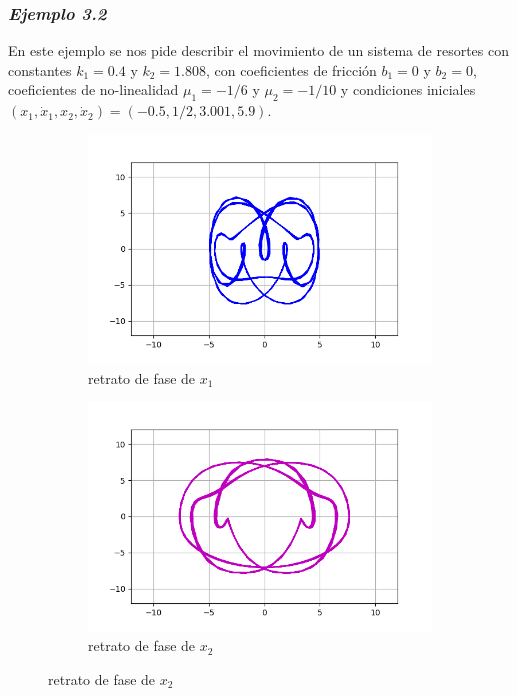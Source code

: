\documentclass{article}
\begin{document}
\subsubsection*{\textit{Ejemplo 3.2}}
En este ejemplo se nos pide describir el movimiento de un sistema de resortes con constantes $k_1=0.4$ y $k_2=1.808$, con coeficientes de fricción $b_1=0$ y $b_2=0$, coeficientes de no-linealidad $\mu_1=-1/6$ y $\mu_2=-1/10$ y condiciones iniciales $(x_1,\dot{x}_1,x_2,\dot{x}_2)=(-0.5,1/2,3.001,5.9)$.

\begin{figure}[ht!]
	\begin{subfigure}[b]{0.5\linewidth}
    \raggedleft
	\includegraphics[width=\linewidth]{ejercicio32-phase-x1.png}
    \caption{retrato de fase de $x_1$}
	\end{subfigure}
	\begin{subfigure}[b]{0.5\linewidth}
    \raggedright
	\includegraphics[width=\linewidth]{ejercicio32-phase-x2.png}
	\caption{retrato de fase de $x_2$}
    \end{subfigure}
\end{figure}
\end{document}
